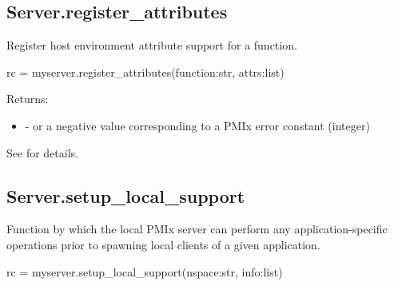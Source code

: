\subsection{Server.register_attributes}

\summary
Register host environment attribute support for a function.

\format

\pyspecificstart
\begin{codepar}
rc = myserver.register_attributes(function:str, attrs:list)
\end{codepar}
\pyspecificend


\begin{arglist}
\end{arglist}

Returns:

\begin{itemize}
    \item {} -  or a negative value corresponding to a PMIx error constant (integer)
\end{itemize}

See  for details.


\subsection{Server.setup_local_support}

\summary
Function by which the local \ac{PMIx} server can perform any application-specific operations prior to spawning local clients of a given application.

\format

\pyspecificstart
\begin{codepar}
rc = myserver.setup_local_support(nspace:str, info:list)
\end{codepar}
\pyspecificend


\begin{arglist}
\end{arglist}

